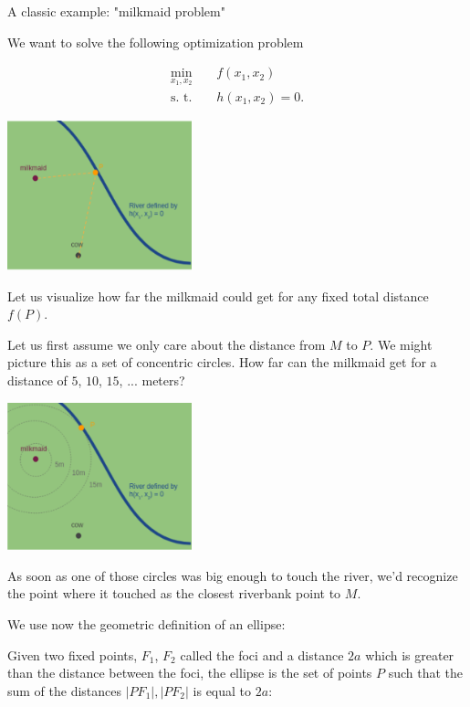 \documentclass[11pt,compress,t,notes=noshow, xcolor=table]{beamer}
\begin{document}
\begin{vbframe}{A classic example: "milkmaid problem"}
\framebreak 

We want to solve the following optimization problem 

\begin{eqnarray*}
	\min_{x_1, x_2} && f(x_1, x_2) \\
	\text{s. t. } && h(x_1, x_2) = 0.
\end{eqnarray*}


\begin{center}
	\includegraphics[width = 0.4\textwidth]{figure_man/milkmaid2.png}
\end{center}


\framebreak 

Let us visualize how far the milkmaid could get for any fixed total distance $f(P)$. 

\vspace*{0.2cm}

Let us first assume we only care about the distance from $M$ to $P$. We might picture this as a set of concentric circles. How far can the milkmaid get for a distance of $5$, $10$, $15$, ... meters?

\begin{center}
	\includegraphics[width = 0.4\textwidth]{figure_man/milkmaid3.png}
\end{center}

As soon as one of those circles was big enough to touch the river, we'd recognize the point where it touched as the closest riverbank point to $M$. 

\framebreak 

We use now the geometric definition of an ellipse: 

Given two fixed points, $F_1$, $F_2$ called the foci and a distance $2a$ which is greater than the distance between the foci, the ellipse is the set of points $P$ such that the sum of the distances $|PF_1|, |PF_2|$ is equal to $2a$: 


\end{vbframe}
\end{document}
